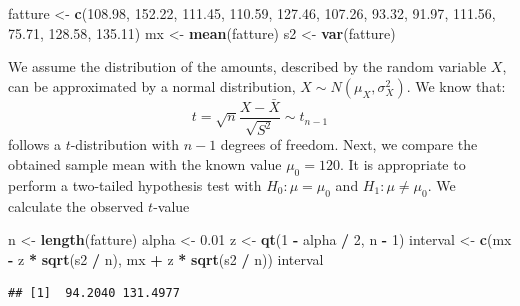 \documentclass[
]{article}
\newenvironment{Shaded}{\begin{snugshade}}{\end{snugshade}}
\newcommand{\DecValTok}[1]{\textcolor[rgb]{0.00,0.00,0.81}{#1}}
\newcommand{\FloatTok}[1]{\textcolor[rgb]{0.00,0.00,0.81}{#1}}
\newcommand{\FunctionTok}[1]{\textcolor[rgb]{0.13,0.29,0.53}{\textbf{#1}}}
\newcommand{\NormalTok}[1]{#1}
\newcommand{\OtherTok}[1]{\textcolor[rgb]{0.56,0.35,0.01}{#1}}
\newcommand{\SpecialCharTok}[1]{\textcolor[rgb]{0.81,0.36,0.00}{\textbf{#1}}}
\begin{document}
\begin{Shaded}
\begin{Highlighting}[]
\NormalTok{fatture }\OtherTok{\textless{}{-}} \FunctionTok{c}\NormalTok{(}\FloatTok{108.98}\NormalTok{, }\FloatTok{152.22}\NormalTok{, }\FloatTok{111.45}\NormalTok{, }\FloatTok{110.59}\NormalTok{, }\FloatTok{127.46}\NormalTok{, }\FloatTok{107.26}\NormalTok{, }\FloatTok{93.32}\NormalTok{, }
             \FloatTok{91.97}\NormalTok{, }\FloatTok{111.56}\NormalTok{, }\FloatTok{75.71}\NormalTok{, }\FloatTok{128.58}\NormalTok{, }\FloatTok{135.11}\NormalTok{)}
\NormalTok{mx }\OtherTok{\textless{}{-}} \FunctionTok{mean}\NormalTok{(fatture)}
\NormalTok{s2 }\OtherTok{\textless{}{-}} \FunctionTok{var}\NormalTok{(fatture)}
\end{Highlighting}
\end{Shaded}

We assume the distribution of the amounts, described by the random
variable \(X\), can be approximated by a normal distribution,
\(X \sim N(\mu_X, \sigma^2_X)\). We know that:
\[t = \sqrt{n}\frac{X - \bar{X}}{\sqrt{S^2}} \sim t_{n-1}\] follows a
\(t\)-distribution with \(n-1\) degrees of freedom. Next, we compare the
obtained sample mean with the known value \(\mu_0 = 120\). It is
appropriate to perform a two-tailed hypothesis test with
\(H_0: \mu = \mu_0\) and \(H_1: \mu \neq \mu_0\). We calculate the
observed \(t\)-value

\begin{Shaded}
\begin{Highlighting}[]
\NormalTok{n }\OtherTok{\textless{}{-}} \FunctionTok{length}\NormalTok{(fatture)}
\NormalTok{alpha }\OtherTok{\textless{}{-}} \FloatTok{0.01}
\NormalTok{z }\OtherTok{\textless{}{-}} \FunctionTok{qt}\NormalTok{(}\DecValTok{1} \SpecialCharTok{{-}}\NormalTok{ alpha }\SpecialCharTok{/} \DecValTok{2}\NormalTok{, n }\SpecialCharTok{{-}} \DecValTok{1}\NormalTok{)}
\NormalTok{interval }\OtherTok{\textless{}{-}} \FunctionTok{c}\NormalTok{(mx }\SpecialCharTok{{-}}\NormalTok{ z }\SpecialCharTok{*} \FunctionTok{sqrt}\NormalTok{(s2 }\SpecialCharTok{/}\NormalTok{ n), mx }\SpecialCharTok{+}\NormalTok{ z }\SpecialCharTok{*} \FunctionTok{sqrt}\NormalTok{(s2 }\SpecialCharTok{/}\NormalTok{ n))}
\NormalTok{interval}
\end{Highlighting}
\end{Shaded}

\begin{verbatim}
## [1]  94.2040 131.4977
\end{verbatim}
\end{document}
